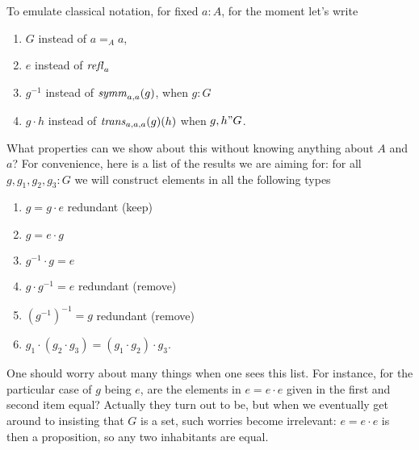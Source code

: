  To emulate classical notation, for fixed $a:A$,  for the moment let's write 
 \begin{enumerate}
 \item $G$ instead of $a=_Aa$,
 \item $e$ instead of $\mathop{{\it refl}_{a}}{}$
 \item $g^{-1}$ instead of $\mathop{\mathit{symm}}_{a,a}(g)$, when $g:G$
 \item $g\cdot h$ instead of $\mathop{\mathit{trans}}_{a,a,a}(g)(h)$ when $g,h"G$.
 \end{enumerate}
 What properties can we show about this without knowing anything about $A$ and $a$? For convenience, here is a list of the results we are aiming for: for all $g,g_1,g_2,g_3:G$ we will construct elements in all the following types 
 \begin{enumerate}
 \item $g=g\cdot e$ redundant (keep)
 \item $g=e\cdot g$
 \item $g^{-1}\cdot g=e$
 \item $g\cdot g^{-1}=e$ redundant (remove)
 \item $(g^{-1})^{-1}=g$ redundant (remove)
 \item $g_1\cdot(g_2\cdot g_3)=(g_1\cdot g_2)\cdot g_3$.
 \end{enumerate}
 \begin{remark}
   One should worry about many things when one sees this list.  For instance, for the particular case of $g$ being $e$, are the elements in $e=e\cdot e$ given in the first and second item equal?  Actually they turn out to be, but when we eventually get around to insisting that $G$ is a set, such worries become irrelevant: $e=e\cdot e$ is then a proposition, so any two inhabitants are equal.
 \end{remark}


